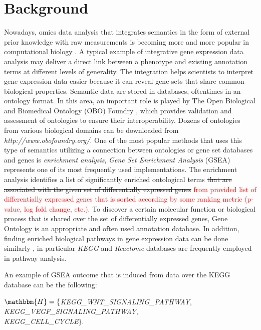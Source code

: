 \documentclass{bmcart}
\begin{document}
\section*{Background}
Nowadays, omics data analysis that integrates semantics in the form of external prior knowledge with raw measurements is becoming more and more popular in computational biology \cite{stevens2000ontology,osterlund2017integrative,rajasundaram2016more}. A typical example of integrative gene expression data analysis may deliver a direct link between a phenotype and existing annotation terms at different levels of generality. The integration helps scientists to interpret gene expression data easier because it can reveal gene sets that share common biological properties. Semantic data are stored in databases, oftentimes in an ontology format. In this area, an important role is played by The Open Biological and Biomedical Ontology (OBO) Foundry \cite{smith2007obo}, which provides validation and assessment of ontologies to ensure their interoperability. Dozens of ontologies from various biological domains can be downloaded from \emph{http://www.obofoundry.org/}. One of the most popular methods that uses this type of semantics utilizing a connection between ontologies or gene set databases and genes is \emph{enrichment analysis}, \emph{Gene Set Enrichment Analysis} (GSEA) \cite{subramanian2005gene} represents one of its most frequently used implementations. The enrichment analysis identifies a list of significantly enriched ontological terms \st{that are associated with the given set of differentially expressed genes} \textcolor{red}{from provided list of differentially expressed genes that is sorted according by some ranking metric (p-value, log fold change, etc.)}. To discover a certain molecular function or biological process that is shared over the set of differentially expressed genes, Gene Ontology \cite{ashburner2000gene,gene2016expansion} is an appropriate and often used annotation database. In addition, finding enriched biological pathways in gene expression data can be done similarly \cite{curtis2005pathways}, in particular \emph{KEGG}  \cite{kanehisa2016kegg,kanehisa2015kegg,kanehisa2000kegg} and \emph{Reactome} \cite{croft2013reactome} databases are frequently employed in pathway analysis.

An example of GSEA outcome that is induced from data over the KEGG database can be the following: 

\begin{center}
    $\mathbbm{H}= \{$\emph{KEGG\_WNT\_SIGNALING\_PATHWAY},\\ \emph{KEGG\_VEGF\_SIGNALING\_PATHWAY},\\ \emph{KEGG\_CELL\_CYCLE}$\}$.
\end{center}
\end{document}
